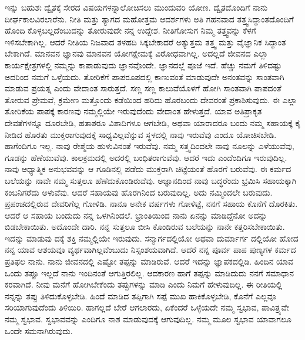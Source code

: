 ಇನ್ನು ಬಹುಶಃ ದ್ವೈತಕ್ಕೆ ಸೇರದ ವಿಷಯಗಳನ್ನಾಲೋಚಿಸಲು ಮುಂದುವರಿ ಯೋಣ. ದ್ವೈತದೊಂದಿಗೆ ನಾನು ದೀರ್ಘಕಾಲವಿರಲಾರೆನು. ನೀತಿ ಮತ್ತು ತ್ಯಾಗದ ಮಹೋತ್ತಮ ಆದರ್ಶಗಳು ಅತಿ ಗಹನವಾದ ತತ್ತ್ವಸಿದ್ಧಾಂತದೊಂದಿಗೆ ಹೊಂದಿ ಕೊಳ್ಳಬಲ್ಲದೆಂಬುದನ್ನು ತೋರುವುದೇ ನನ್ನ ಉದ್ದೇಶ. ನೀತಿಗೋಸುಗ ನಿಮ್ಮ ತತ್ತ್ವವನ್ನು ಕೆಳಗೆ ಇಳಿಸಬೇಕಾಗಿಲ್ಲ. ಆದರೆ ನೀತಿಯ ನಿಜವಾದ ತಳಹದಿ ಸಿಕ್ಕಬೇಕಾದರೆ ಅತ್ಯುತ್ತಮ ತತ್ತ್ವ ಮತ್ತು ವೈಜ್ಞಾನಿಕ ಸಿದ್ಧಾಂತ ಬೇಕಾಗಿದೆ. ಮಾನವನ ಜ್ಞಾನವು ಮಾನವನ ಯೋಗಕ್ಷೇಮಕ್ಕೆ ವಿರೋಧವಾಗಿಲ್ಲ. ಅದಲ್ಲದೆ ಜೀವನದ ಎಲ್ಲಾ ಕಾರ್ಯಕ್ಷೇತ್ರಗಳಲ್ಲಿ ನಮ್ಮನ್ನು ಕಾಪಾಡುವುದು ಜ್ಞಾನವೊಂದೇ. ಜ್ಞಾನದಲ್ಲೆ ಪೂಜೆ ಇದೆ. ಹೆಚ್ಚು ನಮಗೆ ತಿಳಿದಷ್ಟು ಅದರಿಂದ ನಮಗೆ ಒಳ್ಳೆಯದು. ತೋರಿಕೆಗೆ ಪಾಪರೂಪದಲ್ಲಿ ಕಾಣುವಂತೆ ಮಾಡುವುದೇ ಅನಂತವನ್ನು ಸಾಂತವಾಗಿ ಮಾಡುವ ಪ್ರಯತ್ನ ಎಂದು ವೇದಾಂತ ಸಾರುತ್ತದೆ. ಸಣ್ಣ ಸಣ್ಣ ಕಾಲುವೆಯೊಳಗೆ ಹೋಗಿ ಸಾಂತವಾಗಿ ಪಾಪದಂತೆ ತೋರುವ ಪ್ರೇಮವೆ, ಕ್ರಮೇಣ ಮತ್ತೊಂದು ಕಡೆಯಿಂದ ಹರಿದು ಹೊರಬಂದು ದೇವರಂತೆ ಪ್ರಕಾಶಿಸುವುದು. ಈ ಎಲ್ಲಾ ತೋರಿಕೆಯ ಪಾಪಕ್ಕೆ ಕಾರಣವು ನಮ್ಮಲ್ಲಿಯೇ ಇರುವುದೆಂದು ವೇದಾಂತ ಹೇಳುತ್ತದೆ. ಯಾವ ಅತಿಪ್ರಾಕೃತ ದೇವತೆಗಳನ್ನೂ ದೂರಬೇಡಿ, ಹತಾಶರೂ ವಿಶಾದಿಗಳೂ ಆಗಬೇಡಿ, ಅಥವಾ ಯಾರಾದರೂ ಬಂದು ನಮ್ಮ ಸಹಾಯಕ್ಕೆ ಕೈ ನೀಡಿದ ಹೊರತು ಮುಕ್ತರಾಗುವುದಕ್ಕೆ ಸಾಧ್ಯವಿಲ್ಲವೆನ್ನುವ ಸ್ಥಳದಲ್ಲಿ ನಾವು ಇರುವೆವು ಎಂದೂ ಯೋಚಿಸಬೇಡಿ. ಹಾಗೆಂದಿಗೂ ಇಲ್ಲ. ನಾವು ರೇಶ್ಮೆಯ ಹುಳುವಿನಂತೆ ಇರುವೆವು. ನಮ್ಮ ಸತ್ತ್ವದಿಂದಲೇ ನಾವು ನೂಲನ್ನು ಎಳೆಯುವೆವು, ಗೂಡನ್ನು ಹೆಣೆಯುವೆವು. ಕಾಲಕ್ರಮದಲ್ಲಿ ಅದರಲ್ಲಿ ಬಂಧಿತರಾಗುವೆವು. ಆದರೆ ಇದು ಎಂದೆಂದಿಗೂ ಇರುವುದಿಲ್ಲ. ನಾವು ಆಧ್ಯಾತ್ಮಿಕ ಅನುಭವವನ್ನು ಆ ಗೂಡಿನಲ್ಲಿ ಪಡೆದು ಮುಕ್ತರಾಗಿ ಚಿಟ್ಟೆಯಂತೆ ಹೊರಗೆ ಬರುವೆವು. ಈ ಕರ್ಮದ ಬಲೆಯನ್ನು ನಾವೇ ನಮ್ಮ ಸುತ್ತಲೂ ಹೆಣೆದುಕೊಂಡಿರುವೆವು. ಅಜ್ಞಾನದಿಂದ ನಾವು ಬದ್ಧರೆಂದು ಭ್ರಮಿಸಿ ಸಹಾಯಕ್ಕಾಗಿ ಕಂಬನಿಗರೆದು ಅಳುವೆವು. ಆದರೆ ಸಹಾಯವು ಹೊರಗಿನಿಂದ ಬರುವುದಿಲ್ಲ. ಅದು ನಮ್ಮಿಂದಲೇ ಬರುವುದು. ಪ್ರಪಂಚದಲ್ಲಿರುವ ದೇವರಿಗೆಲ್ಲ ಗೋಳಿಡಿ. ನಾನೂ ಅನೇಕ ವರ್ಷಗಳು ಗೋಳಿಟ್ಟೆ, ನನಗೆ ಸಹಾಯ ಕೊನೆಗೆ ದೊರಕಿತು. ಆದರೆ ಆ ಸಹಾಯ ಬಂದುದು ನನ್ನ ಒಳಗಿನಿಂದಲೆ. ಭ್ರಾಂತಿಯಿಂದ ನಾನು ಏನನ್ನು ಮಾಡಿದ್ದೆನೋ ಅದನ್ನು ಬಿಡಬೇಕಾಯಿತು. ಅದೊಂದೇ ದಾರಿ. ನನ್ನ ಸುತ್ತಲೂ ಬೀಸಿ ಕೊಂಡಿರುವ ಬಲೆಯನ್ನು ನಾನೇ ಕತ್ತರಿಸಬೇಕಾಯಿತು. ಇದನ್ನು ಮಾಡುವು ದಕ್ಕೆ ಶಕ್ತಿ ನಮ್ಮಲ್ಲಿಯೇ ಇರುವುದು. ಸನ್ಮಾರ್ಗದಲ್ಲಿಯೋ ಅಥವಾ ದುರ್ಮಾರ್ಗ ದಲ್ಲಿಯೋ ಹೋದ ನನ್ನ ಯಾವ ಆಶಯವೂ ವ್ಯರ್ಥವಾಗಿಲ್ಲವೆಂಬುದು ನಿಸ್ಸಂಶಯವಾಗಿದೆ. ಆದರೆ ನನ್ನ ಪೂರ್ವ ಪಾಪ ಪುಣ್ಯಗಳ ಕರ್ಮದ ಪ್ರತಿಫಲ ನಾನು. ನಾನು ಜೀವನದಲ್ಲಿ ಎಷ್ಟೋ ತಪ್ಪನ್ನು ಮಾಡಿರುವೆ. ಆದರೆ ಇದನ್ನು ಜ್ಞಾಪಕದಲ್ಲಿಡಿ. ಹಿಂದಿನ ಯಾವ ಒಂದು ತಪ್ಪೂ ಇಲ್ಲದೆ ನಾನು ಇಂದಿನಂತೆ ಆಗುತ್ತಿರಲಿಲ್ಲ. ಆದಕಾರಣ ಹಾಗೆ ತಪ್ಪನ್ನು ಮಾಡಿದುದು ನನಗೆ ಸಮಾಧಾನ ಕರವಾಗಿದೆ. ನೀವು ಮನೆಗೆ ಹೋಗಿಬೇಕೆಂದು ತಪ್ಪುಗಳನ್ನು ಮಾಡಿ ಎಂದು ನಿಮಗೆ ಹೇಳುವುದಿಲ್ಲ. ಈ ರೀತಿಯಲ್ಲಿ ನನ್ನನ್ನು ತಪ್ಪು ತಿಳಿದುಕೊಳ್ಳಬೇಡಿ. ಹಿಂದೆ ಮಾಡಿದ ತಪ್ಪಿಗಾಗಿ ಸಪ್ಪೆ ಮುಖ ಹಾಕಿಕೊಳ್ಳಬೇಡಿ, ಕೊನೆಗೆ ಎಲ್ಲವೂ ಸರಿಯಾಗುವುದೆಂದು ತಿಳಿಯಿರಿ. ಹಾಗಲ್ಲದೆ ಬೇರೆ ಆಗಲಾರದು, ಏಕೆಂದರೆ ಒಳ್ಳೆಯದೇ ನಮ್ಮ ಸ್ವಭಾವ, ಪಾವಿತ್ರ್ಯವೇ ನಮ್ಮ ಸ್ವಭಾವ. ಸ್ವಭಾವವನ್ನು ಎಂದಿಗೂ ನಾಶ ಮಾಡುವುದಕ್ಕೆ ಆಗುವುದಿಲ್ಲ. ನಮ್ಮ ಮೂಲ ಸ್ವಭಾವ ಯಾವಾಗಲೂ ಒಂದೇ ಸಮನಾಗಿರುವುದು.

